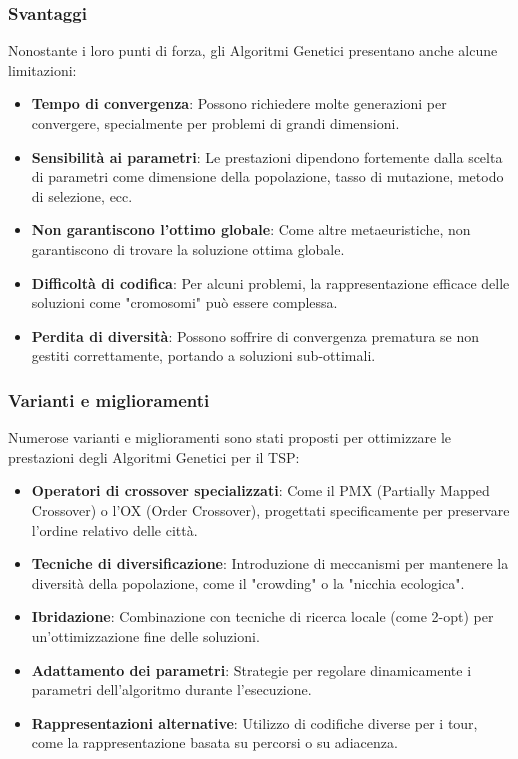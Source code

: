 \subsubsection{Svantaggi}

Nonostante i loro punti di forza, gli Algoritmi Genetici presentano anche alcune limitazioni:

\begin{itemize}
	\item \textbf{Tempo di convergenza}: Possono richiedere molte generazioni per convergere, specialmente per problemi di grandi dimensioni.
	\item \textbf{Sensibilità ai parametri}: Le prestazioni dipendono fortemente dalla scelta di parametri come dimensione della popolazione, tasso di mutazione, metodo di selezione, ecc.
	\item \textbf{Non garantiscono l'ottimo globale}: Come altre metaeuristiche, non garantiscono di trovare la soluzione ottima globale.
	\item \textbf{Difficoltà di codifica}: Per alcuni problemi, la rappresentazione efficace delle soluzioni come "cromosomi" può essere complessa.
	\item \textbf{Perdita di diversità}: Possono soffrire di convergenza prematura se non gestiti correttamente, portando a soluzioni sub-ottimali.
\end{itemize}

\subsubsection{Varianti e miglioramenti}

Numerose varianti e miglioramenti sono stati proposti per ottimizzare le prestazioni degli Algoritmi Genetici per il \gls{TSP}:

\begin{itemize}
	\item \textbf{Operatori di crossover specializzati}: Come il \gls{PMX} (Partially Mapped Crossover) o l'\gls{OX} (Order Crossover), progettati specificamente per preservare l'ordine relativo delle città.
	\item \textbf{Tecniche di diversificazione}: Introduzione di meccanismi per mantenere la diversità della popolazione, come il "crowding" o la "nicchia ecologica".
	\item \textbf{Ibridazione}: Combinazione con tecniche di ricerca locale (come 2-opt) per un'ottimizzazione fine delle soluzioni.
	\item \textbf{Adattamento dei parametri}: Strategie per regolare dinamicamente i parametri dell'algoritmo durante l'esecuzione.
	\item \textbf{Rappresentazioni alternative}: Utilizzo di codifiche diverse per i tour, come la rappresentazione basata su percorsi o su adiacenza.
\end{itemize}



